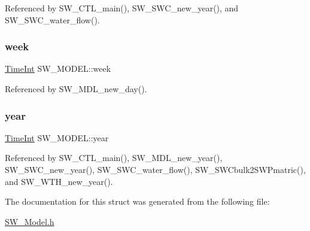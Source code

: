 Referenced by S\+W\+\_\+\+C\+T\+L\+\_\+main(), S\+W\+\_\+\+S\+W\+C\+\_\+new\+\_\+year(), and S\+W\+\_\+\+S\+W\+C\+\_\+water\+\_\+flow().

\mbox{\label{struct_s_w___m_o_d_e_l_a232972133f960d8fa900b0c26fbf4445}} 
\subsubsection{\texorpdfstring{week}{week}}
{\footnotesize\ttfamily \hyperlink{_times_8h_a25ac787161a5cad0e3fdfe5a5aeb3236}{Time\+Int} S\+W\+\_\+\+M\+O\+D\+E\+L\+::week}



Referenced by S\+W\+\_\+\+M\+D\+L\+\_\+new\+\_\+day().

\mbox{\label{struct_s_w___m_o_d_e_l_a3080ab995b14b9e38ef8b41509efc16c}} 
\subsubsection{\texorpdfstring{year}{year}}
{\footnotesize\ttfamily \hyperlink{_times_8h_a25ac787161a5cad0e3fdfe5a5aeb3236}{Time\+Int} S\+W\+\_\+\+M\+O\+D\+E\+L\+::year}



Referenced by S\+W\+\_\+\+C\+T\+L\+\_\+main(), S\+W\+\_\+\+M\+D\+L\+\_\+new\+\_\+year(), S\+W\+\_\+\+S\+W\+C\+\_\+new\+\_\+year(), S\+W\+\_\+\+S\+W\+C\+\_\+water\+\_\+flow(), S\+W\+\_\+\+S\+W\+Cbulk2\+S\+W\+Pmatric(), and S\+W\+\_\+\+W\+T\+H\+\_\+new\+\_\+year().



The documentation for this struct was generated from the following file\+:\begin{DoxyCompactItemize}
\item 
\hyperlink{_s_w___model_8h}{S\+W\+\_\+\+Model.\+h}\end{DoxyCompactItemize}
